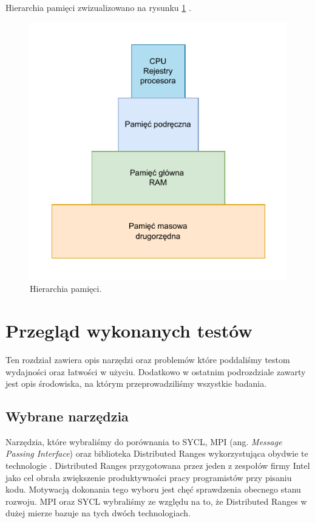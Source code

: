 \documentclass[a4paper,12pt]{book} %
\begin{document}
Hierarchia pamięci zwizualizowano na rysunku \ref{fig:hierarchia_pamieci} \cite{cache-memory}.
\begin{figure}[h]
	\centering
	\includegraphics[scale=1]{assets/hierarchia_pamieci.pdf}
	\caption{Hierarchia pamięci.}
	\label{fig:hierarchia_pamieci}
\end{figure}

\chapter{Przegląd wykonanych testów}
Ten rozdział zawiera opis narzędzi oraz problemów które poddaliśmy testom wydajności oraz łatwości w użyciu. Dodatkowo w ostatnim podrozdziale zawarty jest opis środowiska, na którym przeprowadziliśmy wszystkie badania.
\section{Wybrane narzędzia}
Narzędzia, które wybraliśmy do porównania to SYCL, MPI (ang. \emph{Message Passing Interface}) oraz biblioteka Distributed Ranges wykorzystująca obydwie te technologie \cite{SYCL, MPI, dist-ranges}. Distributed Ranges przygotowana przez jeden z zespołów firmy Intel jako cel obrała zwiększenie produktywności pracy programistów przy pisaniu kodu. Motywacją dokonania tego wyboru jest chęć sprawdzenia obecnego stanu rozwoju. MPI oraz SYCL wybraliśmy ze względu na to, że Distributed Ranges w dużej mierze bazuje na tych dwóch technologiach.
\end{document}
